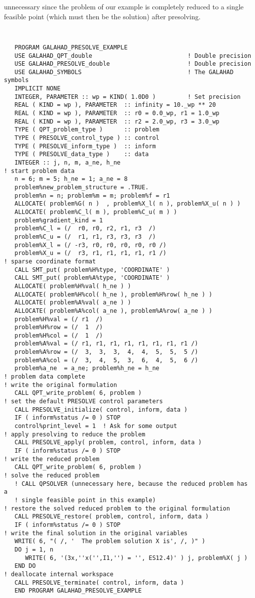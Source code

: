 \documentclass{galahad}
\begin{document}
unnecessary since the problem of our example is completely reduced to a single
feasible point (which must then be the solution) after presolving.
{\tt \small
\begin{verbatim}
   PROGRAM GALAHAD_PRESOLVE_EXAMPLE
   USE GALAHAD_QPT_double                           ! Double precision
   USE GALAHAD_PRESOLVE_double                      ! Double precision
   USE GALAHAD_SYMBOLS                              ! The GALAHAD symbols
   IMPLICIT NONE
   INTEGER, PARAMETER :: wp = KIND( 1.0D0 )         ! Set precision
   REAL ( KIND = wp ), PARAMETER  :: infinity = 10._wp ** 20
   REAL ( KIND = wp ), PARAMETER  :: r0 = 0.0_wp, r1 = 1.0_wp
   REAL ( KIND = wp ), PARAMETER  :: r2 = 2.0_wp, r3 = 3.0_wp
   TYPE ( QPT_problem_type )      :: problem
   TYPE ( PRESOLVE_control_type ) :: control
   TYPE ( PRESOLVE_inform_type )  :: inform
   TYPE ( PRESOLVE_data_type )    :: data
   INTEGER :: j, n, m, a_ne, h_ne
! start problem data
   n = 6; m = 5; h_ne = 1; a_ne = 8
   problem%new_problem_structure = .TRUE.
   problem%n = n; problem%m = m; problem%f = r1
   ALLOCATE( problem%G( n )  , problem%X_l( n ), problem%X_u( n ) )
   ALLOCATE( problem%C_l( m ), problem%C_u( m ) )
   problem%gradient_kind = 1
   problem%C_l = (/  r0, r0, r2, r1, r3  /)
   problem%C_u = (/  r1, r1, r3, r3, r3  /)
   problem%X_l = (/ -r3, r0, r0, r0, r0, r0 /)
   problem%X_u = (/  r3, r1, r1, r1, r1, r1 /)
! sparse coordinate format
   CALL SMT_put( problem%H%type, 'COORDINATE' )
   CALL SMT_put( problem%A%type, 'COORDINATE' )
   ALLOCATE( problem%H%val( h_ne ) )
   ALLOCATE( problem%H%col( h_ne ), problem%H%row( h_ne ) )
   ALLOCATE( problem%A%val( a_ne ) )
   ALLOCATE( problem%A%col( a_ne ), problem%A%row( a_ne ) )
   problem%H%val = (/ r1  /)
   problem%H%row = (/  1  /)
   problem%H%col = (/  1  /)
   problem%A%val = (/ r1, r1, r1, r1, r1, r1, r1, r1 /)
   problem%A%row = (/  3,  3,  3,  4,  4,  5,  5,  5 /)
   problem%A%col = (/  3,  4,  5,  3,  6,  4,  5,  6 /)
   problem%a_ne  = a_ne; problem%h_ne = h_ne
! problem data complete
! write the original formulation
   CALL QPT_write_problem( 6, problem )
! set the default PRESOLVE control parameters
   CALL PRESOLVE_initialize( control, inform, data )
   IF ( inform%status /= 0 ) STOP
   control%print_level = 1  ! Ask for some output
! apply presolving to reduce the problem
   CALL PRESOLVE_apply( problem, control, inform, data )
   IF ( inform%status /= 0 ) STOP
! write the reduced problem
   CALL QPT_write_problem( 6, problem )
! solve the reduced problem
   ! CALL QPSOLVER (unnecessary here, because the reduced problem has a
   ! single feasible point in this example)
! restore the solved reduced problem to the original formulation
   CALL PRESOLVE_restore( problem, control, inform, data )
   IF ( inform%status /= 0 ) STOP
! write the final solution in the original variables
   WRITE( 6, "( /, '  The problem solution X is', /, )" )
   DO j = 1, n
      WRITE( 6, '(3x,''x('',I1,'') = '', ES12.4)' ) j, problem%X( j )
   END DO
! deallocate internal workspace
   CALL PRESOLVE_terminate( control, inform, data )
   END PROGRAM GALAHAD_PRESOLVE_EXAMPLE
\end{verbatim}
}
\end{document}
